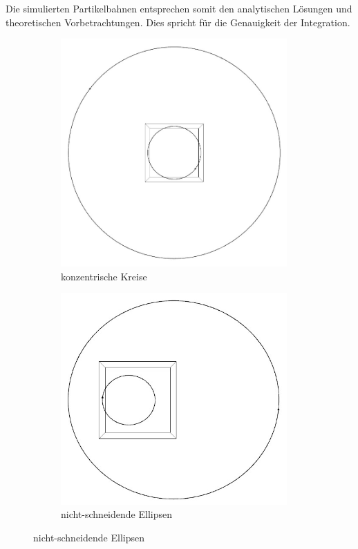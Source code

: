     Die simulierten Partikelbahnen entsprechen somit den analytischen Lösungen und theoretischen Vorbetrachtungen.
    Dies spricht für die Genauigkeit der Integration.

    \begin{figure}
      \center
      \begin{subfigure}[b]{0.49\textwidth}
        \center
        \includegraphics[width=0.95\textwidth]{pictures/two_body/circle.jpg}
        \caption{konzentrische Kreise}
        \label{subfig:konz-kreis}
      \end{subfigure}
      \begin{subfigure}[b]{0.49\textwidth}
        \center
        \includegraphics[width=0.95\textwidth]{pictures/two_body/ellipse_no-intersect.jpg}
        \caption{nicht-schneidende Ellipsen}
      \end{subfigure}


\end{figure}
